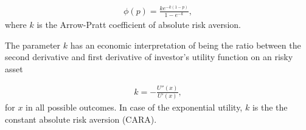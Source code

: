 \begin{align}
	\phi(p) =\frac{k e^{-k(1-p)}}{1-e^{-k}} , \label{eq:phi}
	\end{align}
where $k$ is the Arrow-Pratt coefficient of absolute risk aversion. \medskip

The parameter $k$ has an economic interpretation of being the ratio between the second derivative and first derivative
of investor's utility function on an risky asset

\begin{align}
	k = -\frac{U''(x)}{U'(x)},
	\end{align}
for $x$ in all possible outcomes.
In case of the exponential utility, $k$ is the the constant absolute risk aversion (CARA).




